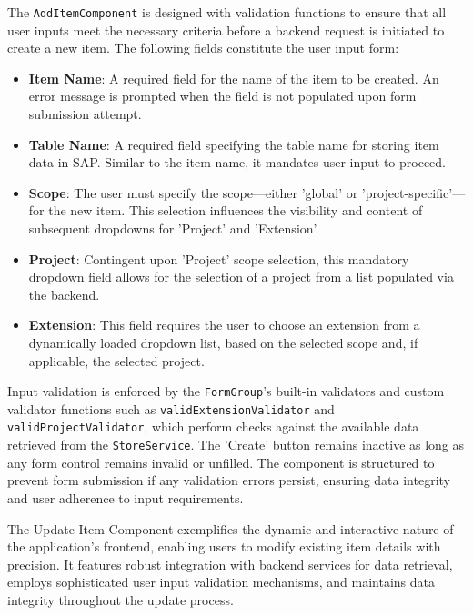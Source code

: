 The \texttt{AddItemComponent} is designed with validation functions to ensure that all user inputs meet the necessary criteria before a backend request is initiated to create a new item.
The following fields constitute the user input form:

\begin{itemize}
    \item \textbf{Item Name}: A required field for the name of the item to be created.
    An error message is prompted when the field is not populated upon form submission attempt.
    \item \textbf{Table Name}: A required field specifying the table name for storing item data in SAP. Similar to the item name, it mandates user input to proceed.
    \item \textbf{Scope}: The user must specify the scope—either 'global' or 'project-specific'—for the new item.
    This selection influences the visibility and content of subsequent dropdowns for 'Project' and 'Extension'.
    \item \textbf{Project}: Contingent upon 'Project' scope selection, this mandatory dropdown field allows for the selection of a project from a list populated via the backend.
    \item \textbf{Extension}: This field requires the user to choose an extension from a dynamically loaded dropdown list, based on the selected scope and, if applicable, the selected project.
\end{itemize}

Input validation is enforced by the \texttt{FormGroup}'s built-in validators and custom validator functions such as \texttt{validExtensionValidator} and \\\texttt{validProjectValidator}, which perform checks against the available data retrieved from the \texttt{StoreService}.
The 'Create' button remains inactive as long as any form control remains invalid or unfilled.
The component is structured to prevent form submission if any validation errors persist, ensuring data integrity and user adherence to input requirements.


The Update Item Component exemplifies the dynamic and interactive nature of the application's frontend, enabling users to modify existing item details with precision.
It features robust integration with backend services for data retrieval, employs sophisticated user input validation mechanisms, and maintains data integrity throughout the update process.

